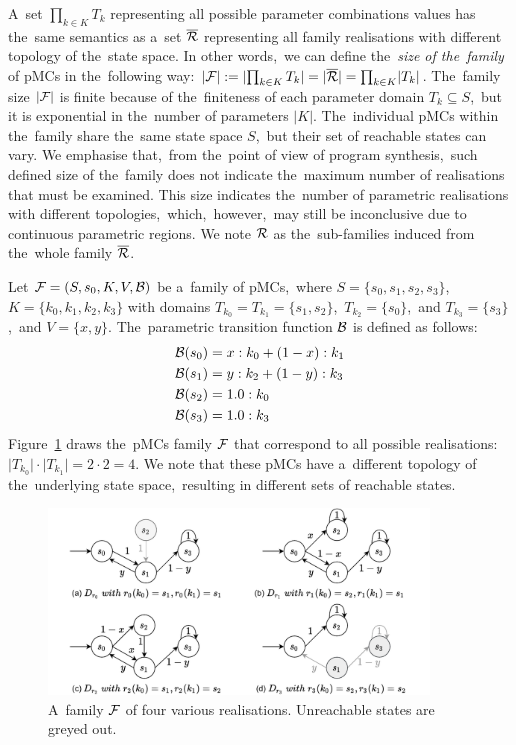 A~set $\prod_{k \in K} T_k$ representing all possible parameter combinations values has the~same semantics as a~set $\overline{\mathcal{R}}$ representing all family realisations with different topology of the~state space.
In other words,~we can define the~\textit{size of the~family} of pMCs in the~following way: $\lvert \mathcal{F} \rvert := \lvert \prod_{k \in K} T_k \rvert = \lvert \overline{\mathcal{R}} \rvert = \prod_{k \in K} \lvert T_k \rvert$.
The~family size $\lvert \mathcal{F} \rvert$ is finite because of the~finiteness of each parameter domain $T_k \subseteq S$,~but it is exponential in the~number of parameters $\lvert K \rvert$.
The~individual pMCs within the~family share the~same state space $S$,~but their set of reachable states can vary.
We emphasise that,~from the~point of view of program synthesis,~such defined size of the~family does not indicate the~maximum number of realisations that must be examined.
This size indicates the~number of parametric realisations with different topologies,~which,~however,~may still be inconclusive due to continuous parametric regions.
We note $\mathcal{R}$ as the~sub-families induced from the~whole family $\overline{\mathcal{R}}$.

\begin{example}\label{exam:mcfamily}
Let $\mathcal{F} = (S,s_{0},K, V, \mathcal{B})$ be a~family of pMCs,~where $S = \{s_0, s_1, s_2, s_3\}$,~$K = \{ k_0, k_1, k_2, k_3 \}$ with domains $T_{k_0} = T_{k_1} = \{s_1, s_2\}$,~$T_{k_2} = \{ s_0 \}$,~and $T_{k_3} = \{ s_3 \}$,~and $V = \{ x, y \}$.
The~parametric transition function $\mathcal{B}$ is defined as follows:
\begin{align*}
    \mathcal{B}(s_0) &= x : k_0 + (1-x) : k_1  \\
    \mathcal{B}(s_1)  &= y : k_2  + (1-y) : k_3 \\
    \mathcal{B}(s_2) &= 1.0 : k_0  \\
    \mathcal{B}(s_3)  &= 1.0 : k_3
\end{align*}
Figure~\ref{fig:mcfamily} draws the~pMCs family $\mathcal{F}$ that correspond to all possible realisations: $\lvert T_{k_0} \rvert \cdot \lvert T_{k_1} \rvert = 2 \cdot 2 = 4$.
We note that these pMCs have a~different topology of the~underlying state space,~resulting in different sets of reachable states.
\end{example}

\begin{figure}[ht!]
\centering
\includegraphics[width=0.9\textwidth]{figures/MCFamily.pdf}
\caption{A~family $\mathcal{F}$ of four various realisations. Unreachable states are greyed out.}%
\label{fig:mcfamily}%
\end{figure}

